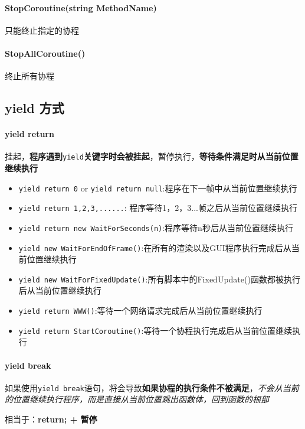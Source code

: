 \documentclass[UTF8,a4paper,12pt]{ctexbook}
\begin{document}
			\paragraph{StopCoroutine(string MethodName)}
				只能终止指定的协程
			
			\paragraph{StopAllCoroutine()}
				终止所有协程
				
		\subsection{yield 方式}
			\paragraph{yield return}
				挂起，\textbf{程序遇到}\verb|yield|\textbf{关键字时会被挂起}，暂停执行，\textbf{等待条件满足时从当前位置继续执行}
				
				\begin{itemize}
					\item \verb|yield return 0| or \verb|yield return null|:程序在下一帧中从当前位置继续执行
					\item \verb|yield return 1,2,3,......|: 程序等待1，2，3...帧之后从当前位置继续执行
					\item \verb|yield return new WaitForSeconds(n)|:程序等待n秒后从当前位置继续执行
					\item \verb|yield new WaitForEndOfFrame()|:在所有的渲染以及GUI程序执行完成后从当前位置继续执行
					\item \verb|yield new WaitForFixedUpdate()|:所有脚本中的FixedUpdate()函数都被执行后从当前位置继续执行
					\item \verb|yield return WWW()|:等待一个网络请求完成后从当前位置继续执行
					\item \verb|yield return StartCoroutine()|:等待一个协程执行完成后从当前位置继续执行
				\end{itemize}
			
			\paragraph{yield break}
				如果使用\verb|yield break|语句，将会导致\textbf{如果协程的执行条件不被满足}，\textit{不会从当前的位置继续执行程序，而是直接从当前位置跳出函数体，回到函数的根部}
				
				\color{blue}相当于：\textbf{return; + 暂停}\color{black}
				
\end{document}
